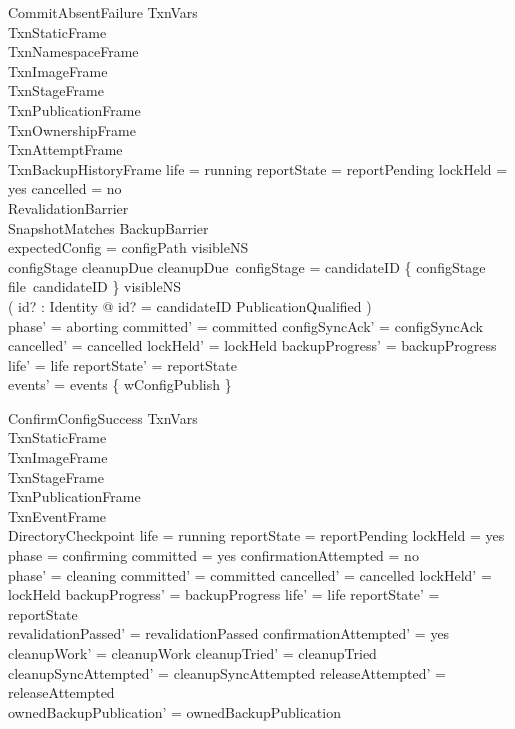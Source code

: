 \documentclass{article}
\begin{document}
\begin{schema}{CommitAbsentFailure}
	\Delta TxnVars \\
	TxnStaticFrame \\
	TxnNamespaceFrame \\
	TxnImageFrame \\
	TxnStageFrame \\
	TxnPublicationFrame \\
	TxnOwnershipFrame \\
	TxnAttemptFrame \\
	TxnBackupHistoryFrame
	\where
	life = running \land reportState = reportPending \land lockHeld = yes \land
	cancelled = no \\
	RevalidationBarrier \\
	SnapshotMatches \land BackupBarrier \\
	expectedConfig = \emptyset \land configPath \notin \dom visibleNS \\
	configStage \in \dom cleanupDue \land cleanupDue~configStage = candidateID \land
	\{ configStage \mapsto file~candidateID \} \subseteq visibleNS \\
	( \exists id? : Identity @ id? = candidateID \land PublicationQualified ) \\
	phase' = aborting \land committed' = committed \land
	configSyncAck' = configSyncAck \land cancelled' = cancelled \land
	lockHeld' = lockHeld \land backupProgress' = backupProgress \land
	life' = life \land reportState' = reportState \\
	events' = events \cup \{ wConfigPublish \}
\end{schema}

\begin{schema}{ConfirmConfigSuccess}
	\Delta TxnVars \\
	TxnStaticFrame \\
	TxnImageFrame \\
	TxnStageFrame \\
	TxnPublicationFrame \\
	TxnEventFrame \\
	DirectoryCheckpoint
	\where
	life = running \land reportState = reportPending \land lockHeld = yes \land
	phase = confirming \land committed = yes \land confirmationAttempted = no \\
	phase' = cleaning \land committed' = committed \land cancelled' = cancelled \land
	lockHeld' = lockHeld \land backupProgress' = backupProgress \land
	life' = life \land reportState' = reportState \\
	revalidationPassed' = revalidationPassed \land confirmationAttempted' = yes \land
	cleanupWork' = cleanupWork \land cleanupTried' = cleanupTried \land
	cleanupSyncAttempted' = cleanupSyncAttempted \land releaseAttempted' = releaseAttempted \\
	ownedBackupPublication' = ownedBackupPublication
\end{schema}
\end{document}
